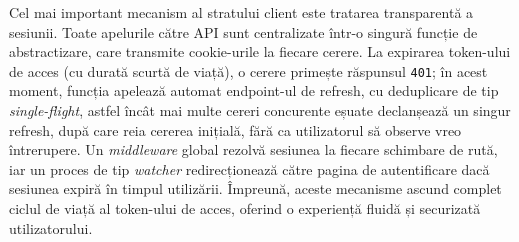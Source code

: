 Cel mai important mecanism al stratului client este tratarea transparentă a sesiunii. Toate apelurile către API sunt centralizate într-o singură funcție de abstractizare, care transmite cookie-urile la fiecare cerere. La expirarea token-ului de acces (cu durată scurtă de viață), o cerere primește răspunsul \texttt{401}; în acest moment, funcția apelează automat endpoint-ul de refresh, cu deduplicare de tip \textit{single-flight}, astfel încât mai multe cereri concurente eșuate declanșează un singur refresh, după care reia cererea inițială, fără ca utilizatorul să observe vreo întrerupere. Un \textit{middleware} global rezolvă sesiunea la fiecare schimbare de rută, iar un proces de tip \textit{watcher} redirecționează către pagina de autentificare dacă sesiunea expiră în timpul utilizării. Împreună, aceste mecanisme ascund complet ciclul de viață al token-ului de acces, oferind o experiență fluidă și securizată utilizatorului.